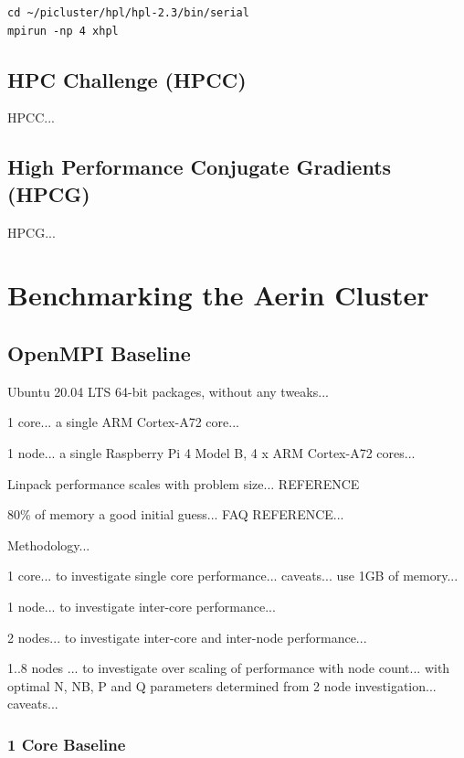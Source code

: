 \documentclass{report}
\begin{document}
\lstset{style=termstyle}
\begin{lstlisting}
cd ~/picluster/hpl/hpl-2.3/bin/serial
mpirun -np 4 xhpl
\end{lstlisting}


%
%
\section{HPC Challenge (HPCC)}

HPCC...


%
%
\section{High Performance Conjugate Gradients (HPCG)}

HPCG...



%
%
\chapter{Benchmarking the Aerin Cluster}


\section{OpenMPI Baseline}

Ubuntu 20.04 LTS 64-bit packages, without any tweaks...

1 core... a single ARM Cortex-A72 core...

1 node... a single Raspberry Pi 4 Model B, 4 x ARM Cortex-A72 cores...

Linpack performance scales with problem size... REFERENCE

80\% of memory a good initial guess... FAQ REFERENCE...


Methodology...

1 core... to investigate single core performance... caveats... use 1GB of memory...

1 node... to investigate inter-core performance...

2 nodes... to investigate inter-core and inter-node performance...

1..8 nodes ... to investigate over scaling of performance with node count... with optimal N, NB, P and Q parameters determined from 2 node investigation... caveats...




\subsection{1 Core Baseline}
\end{document}
